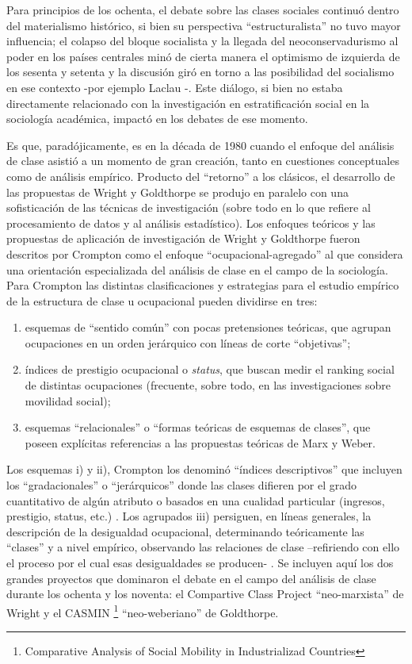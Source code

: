 \documentclass[
]{book}
\providecommand{\tightlist}{%
  \setlength{\itemsep}{0pt}\setlength{\parskip}{0pt}}
\begin{document}
Para principios de los ochenta, el debate sobre las clases sociales continuó dentro del materialismo histórico, si bien su perspectiva ``estructuralista'' no tuvo mayor influencia; el colapso del bloque socialista y la llegada del neoconservadurismo al poder en los países centrales minó de cierta manera el optimismo de izquierda de los sesenta y setenta y la discusión giró en torno a las posibilidad del socialismo en ese contexto -por ejemplo Laclau \citeyearpar{Laclau1987}-. Este diálogo, si bien no estaba directamente relacionado con la investigación en estratificación social en la sociología académica, impactó en los debates de ese momento.

Es que, paradójicamente, es en la década de 1980 cuando el enfoque del análisis de clase asistió a un momento de gran creación, tanto en cuestiones conceptuales como de análisis empírico. Producto del ``retorno'' a los clásicos, el desarrollo de las propuestas de Wright y Goldthorpe se produjo en paralelo con una sofisticación de las técnicas de investigación (sobre todo en lo que refiere al procesamiento de datos y al análisis estadístico). Los enfoques teóricos y las propuestas de aplicación de investigación de Wright y Goldthorpe fueron descritos por Crompton \citeyearpar[p.~50]{Crompton2008} como el enfoque ``ocupacional-agregado'' al que considera una orientación especializada del análisis de clase en el campo de la sociología. Para Crompton las distintas clasificaciones y estrategias para el estudio empírico de la estructura de clase u ocupacional pueden dividirse en tres:

\begin{enumerate}
\def\labelenumi{\roman{enumi}.}
\tightlist
\item
  esquemas de ``sentido común'' con pocas pretensiones teóricas, que agrupan ocupaciones en un orden jerárquico con líneas de corte ``objetivas'';
\item
  índices de prestigio ocupacional o \emph{status}, que buscan medir el ranking social de distintas ocupaciones (frecuente, sobre todo, en las investigaciones sobre movilidad social);
\item
  esquemas ``relacionales'' o ``formas teóricas de esquemas de clases'', que poseen explícitas referencias a las propuestas teóricas de Marx y Weber.
\end{enumerate}

Los esquemas i) y ii), Crompton los denominó ``índices descriptivos'' que incluyen los ``gradacionales'' o ``jerárquicos'' donde las clases difieren por el grado cuantitativo de algún atributo o basados en una cualidad particular (ingresos, prestigio, status, etc.) . Los agrupados iii) persiguen, en líneas generales, la descripción de la desigualdad ocupacional, determinando teóricamente las ``clases'' y a nivel empírico, observando las relaciones de clase --refiriendo con ello el proceso por el cual esas desigualdades se producen- \citeyearpar[p.~49]{Crompton2008}. Se incluyen aquí los dos grandes proyectos que dominaron el debate en el campo del análisis de clase durante los ochenta y los noventa: el Compartive Class Project ``neo-marxista'' de Wright y el CASMIN \footnote{Comparative
  Analysis of Social Mobility in Industrializad Countries} ``neo-weberiano'' de Goldthorpe.
\end{document}
